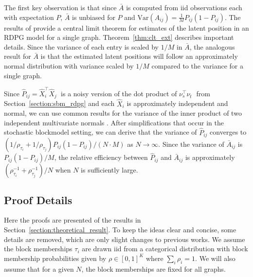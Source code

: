 \documentclass[journal,twoside,web]{ieeecolor}
\begin{document}
The first key observation is that since $\bar{A}$ is computed from iid observations each with expectation $P$, $\bar{A}$ is unbiased for $P$ and $\mathrm{Var}(A_{ij}) = \frac{1}{M}P_{ij}(1-P_{ij})$.
The results of  provide a central limit theorem for estimates of the latent position in an RDPG model for a single graph. Theorem~\ref{thm:clt_ext} describes important details.
Since the variance of each entry is scaled by $1/M$ in $\bar{A}$, the analogous result for $\bar{A}$ is that the estimated latent positions will follow an approximately normal distribution with variance scaled by $1/M$ compared to the variance for a single graph.




Since $\hat{P}_{ij} = \hat{X}_i^{\top} \hat{X}_j^{\phantom{\top}}$ is a noisy version of the dot product of $\nu_s^{\top} \nu_t^{\phantom{\top}}$ from Section~\ref{section:sbm_rdpg} and each $\hat{X}_i$ is approximately independent and normal, we can use common results for the variance of the inner product of two independent multivariate normals .
After simplifications that occur in the stochastic blockmodel setting, we can derive that the variance of $\hat{P}_{ij}$ converges to $\left( 1/\rho_{\tau_i} + 1/\rho_{\tau_j} \right) P_{ij} (1-P_{ij})/(N \cdot M)$ as $N \rightarrow \infty$.
Since the variance of $\bar{A}_{ij}$ is $P_{ij} (1-P_{ij})/M$, the relative efficiency between $\hat{P}_{ij}$ and $\bar{A}_{ij}$ is approximately $(\rho_{\tau_i}^{-1} + \rho_{\tau_j}^{-1})/N$ when $N$ is sufficiently large.


\subsection{Proof Details}
Here the proofs are presented of the results in Section~\ref{section:theoretical_result}. To keep the ideas clear and concise, some details are removed, which are only slight changes to previous works.
We assume the block memberships $\tau_i$ are drawn iid from a categorical distribution with block membership probabilities given by $\rho\in[0,1]^K$ where $\sum_i \rho_i =1$.
We will also assume that for a given $N$, the block memberships are fixed for all graphs.
\end{document}
